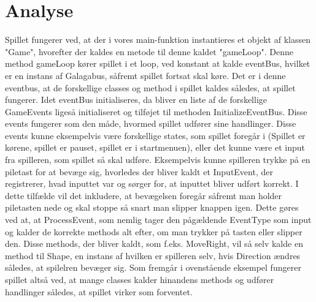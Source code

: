 \section{Analyse}

Spillet fungerer ved, at der i vores main-funktion instantieres et objekt af klassen "Game", hvorefter der kaldes en metode til denne kaldet "gameLoop".
Denne method gameLoop kører spillet i et loop, ved konstant at kalde eventBus, hvilket er en instans af Galagabus, såfremt spillet fortsat skal køre. Det er i denne eventbus, at de forskellige classes og method
i spillet kaldes således, at spillet fungerer. Idet eventBus initialiseres, da bliver en liste af de forskellige GameEvents ligeså initialiseret og tilføjet til methoden InitializeEventBus.
Disse events fungerer som den måde, hvormed spillet udfører sine handlinger. Disse events kunne eksempelvis være forskellige states, som spillet foregår i (Spillet er kørene, spillet er pauset, spillet er i startmenuen), eller det kunne være et input fra spilleren, som spillet så skal udføre. Eksempelvis kunne spilleren trykke på en piletast for at bevæge sig, hvorledes der bliver kaldt et InputEvent, der registrerer, hvad inputtet var og sørger for, at inputtet bliver udført korrekt. I dette tilfælde vil det inkludere, at bevægelsen foregår såfremt man holder piletasten nede og skal stoppe så snart man slipper knappen igen. Dette gøres ved at, at ProcessEvent, som nemlig tager den pågældende EventType som input og kalder de korrekte methods alt efter, om man trykker på tasten eller slipper den.
Disse methods, der bliver kaldt, som f.eks. MoveRight, vil så selv kalde en method til Shape, en instans af hvilken er spilleren selv, hvis Direction ændres således, at spilelren bevæger sig.
Som fremgår i ovenstående eksempel fungerer spillet altså ved, at mange classes kalder hinandens methods og udfører handlinger således, at spillet virker som forventet. 
